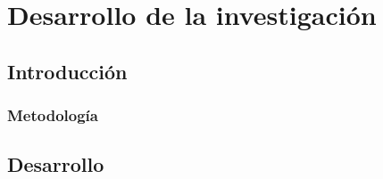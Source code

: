 \chapter{Desarrollo de la investigaci\'{o}n}
\label{sec:chapter4}

\section{Introducci\'{o}n}




\subsection{Metodolog\'ia}
\label{subsec:411metodologia}




\section{Desarrollo}


